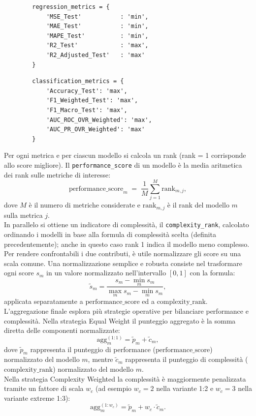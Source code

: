 \documentclass[a4paper,12pt]{report}
\begin{document}
	\begin{verbatim}
		regression_metrics = {
			'MSE_Test'           : 'min',
			'MAE_Test'           : 'min',
			'MAPE_Test'          : 'min',
			'R2_Test'            : 'max',
			'R2_Adjusted_Test'   : 'max'
		}
	\end{verbatim}
	\begin{verbatim}
		classification_metrics = {
			'Accuracy_Test': 'max',
			'F1_Weighted_Test': 'max',
			'F1_Macro_Test': 'max',
			'AUC_ROC_OVR_Weighted': 'max',
			'AUC_PR_OVR_Weighted': 'max'
		}
	\end{verbatim}
	
	Per ogni metrica e per ciascun modello si calcola un rank (rank = 1 corrisponde allo score migliore). Il \texttt{performance\_score} di un modello è la media aritmetica dei rank sulle metriche di interesse:
	\[
	\text{performance\_score}_m \;=\; \frac{1}{M}\sum_{j=1}^{M} \text{rank}_{m,j},
	\]
	dove \(M\) è il numero di metriche considerate e \(\text{rank}_{m,j}\) è il rank del modello \(m\) sulla metrica \(j\). \\
	In parallelo si ottiene un indicatore di complessità, il \texttt{complexity\_rank}, calcolato ordinando i modelli in base alla formula di complessità scelta (definita precedentemente); anche in questo caso rank 1 indica il modello meno complesso. Per rendere confrontabili i due contributi, è utile normalizzare gli score su una scala comune. Una normalizzazione semplice e robusta consiste nel trasformare ogni score $s_m$ in un valore normalizzato nell'intervallo \([0,1]\) con la formula:
	\[
	\tilde{s}_m = \frac{s_m - \min_m s_m}{\max_m s_m - \min_m s_m},
	\]
	applicata separatamente a \(\text{performance\_score}\) ed a \(\text{complexity\_rank}\). \\
	L'aggregazione finale esplora più strategie operative per bilanciare performance e complessità. Nella strategia Equal Weight il punteggio aggregato è la somma diretta delle componenti normalizzate:
	\[
	\text{agg}_{m}^{(1:1)} = \tilde{p}_m + \tilde{c}_m,
	\]
	dove $\tilde{p}_m$ rappresenta il punteggio di performance ($\text{performance\_score}$) normalizzato del modello $m$, mentre $\tilde{c}_m$ rappresenta il punteggio di complessità ($\text{complexity\_rank}$) normalizzato del modello $m$. \\
	Nella strategia Complexity Weighted la complessità è maggiormente penalizzata tramite un fattore di scala \(w_c\) (ad esempio \(w_c=2\) nella variante 1:2 e \(w_c=3\) nella variante extreme 1:3):
	\[
	\text{agg}_{m}^{(1:w_c)} = \tilde{p}_m + w_c \cdot \tilde{c}_m.
	\]
\end{document}
